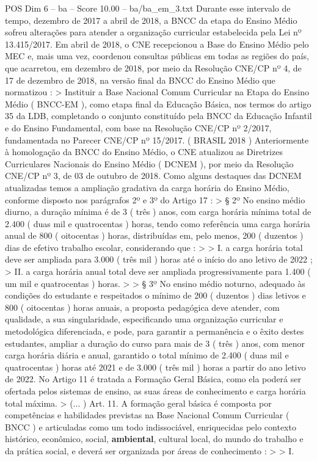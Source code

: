 \begin{textsample}{POS Dim 6 – ba – Score 10.00 – ba/ba\_em\_3.txt}
Durante esse intervalo de tempo, dezembro de 2017 a abril de 2018, a BNCC da etapa do Ensino Médio sofreu alterações para atender a organização curricular estabelecida pela Lei nº 13.415/2017.
Em abril de 2018, o CNE recepcionou a Base do Ensino Médio pelo MEC e, mais uma vez, coordenou consultas públicas em todas as regiões do país, que acarretou, em dezembro de 2018, por meio da Resolução CNE/CP nº 4, de 17 de dezembro de 2018, na versão final da BNCC do Ensino Médio que normatizou : > Instituir a Base Nacional Comum Curricular na Etapa do Ensino Médio ( BNCC-EM ), como etapa final da Educação Básica, nos termos do artigo 35 da LDB, completando o conjunto constituído pela BNCC da Educação Infantil e do Ensino Fundamental, com base na Resolução CNE/CP nº 2/2017, fundamentada no Parecer CNE/CP nº 15/2017. ( BRASIL 2018 ) Anteriormente à homologação da BNCC do Ensino Médio, o CNE atualizou as Diretrizes Curriculares Nacionais do Ensino Médio ( DCNEM ), por meio da Resolução CNE/CP nº 3, de 03 de outubro de 2018.
Como alguns destaques das DCNEM atualizadas temos a ampliação gradativa da carga horária do Ensino Médio, conforme disposto nos parágrafos 2º e 3º do Artigo 17 : > § 2º No ensino médio diurno, a duração mínima é de 3 ( três ) anos, com carga horária mínima total de 2.400 ( duas mil e quatrocentas ) horas, tendo como referência uma carga horária anual de 800 ( oitocentas ) horas, distribuídas em, pelo menos, 200 ( duzentos ) dias de efetivo trabalho escolar, considerando que : > > I. a carga horária total deve ser ampliada para 3.000 ( três mil ) horas até o início do ano letivo de 2022 ; > II. a carga horária anual total deve ser ampliada progressivamente para 1.400 ( um mil e quatrocentas ) horas. > > § 3º No ensino médio noturno, adequado às condições do estudante e respeitados o mínimo de 200 ( duzentos ) dias letivos e 800 ( oitocentas ) horas anuais, a proposta pedagógica deve atender, com qualidade, a sua singularidade, especificando uma organização curricular e metodológica diferenciada, e pode, para garantir a permanência e o êxito destes estudantes, ampliar a duração do curso para mais de 3 ( três ) anos, com menor carga horária diária e anual, garantido o total mínimo de 2.400 ( duas mil e quatrocentas ) horas até 2021 e de 3.000 ( três mil ) horas a partir do ano letivo de 2022.
No Artigo 11 é tratada a Formação Geral Básica, como ela poderá ser ofertada pelos sistemas de ensino, as suas áreas de conhecimento e carga horária total máxima. > (... ) Art. 11.
A formação geral básica é composta por competências e habilidades previstas na Base Nacional Comum Curricular ( BNCC ) e articuladas como um todo indissociável, enriquecidas pelo contexto histórico, econômico, social, \textbf{ambiental}, cultural local, do mundo do trabalho e da prática social, e deverá ser organizada por áreas de conhecimento : > > I.

\end{textsample}
